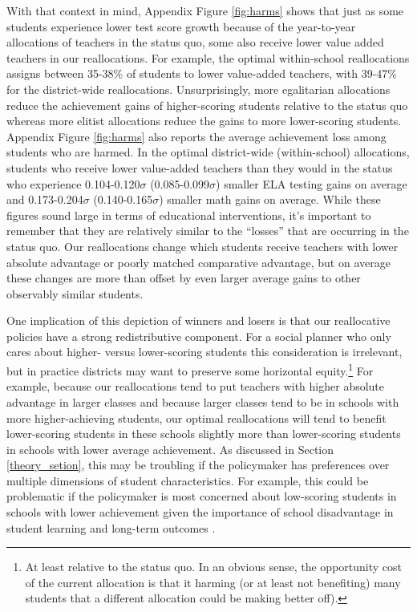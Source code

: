 \documentclass[12pt]{article}
\theoremstyle{definition}
\theoremstyle{definition}
\theoremstyle{definition}
\theoremstyle{definition}
\begin{document}
With that context in mind, Appendix Figure \ref{fig:harms} shows that just as some students experience lower test score growth because of the year-to-year allocations of teachers in the status quo, some also receive lower value added teachers in our reallocations. For example, the optimal within-school reallocations assigns between 35-38\% of students to lower value-added teachers, with 39-47\% for the district-wide reallocations. Unsurprisingly, more egalitarian allocations reduce the achievement gains of higher-scoring students relative to the status quo whereas more elitist allocations reduce the gains to more lower-scoring students. Appendix Figure \ref{fig:harms} also reports the average achievement loss among students who are harmed. In the optimal district-wide (within-school) allocations, students who receive lower value-added teachers than they would in the status who experience 0.104-0.120$\sigma$ (0.085-0.099$\sigma$) smaller ELA testing gains on average and 0.173-0.204$\sigma$ (0.140-0.165$\sigma$) smaller math gains on average. While these figures sound large in terms of educational interventions, it's important to remember that they are relatively similar to the ``losses'' that are occurring in the status quo. Our reallocations change which students receive teachers with lower absolute advantage or poorly matched comparative advantage, but on average these changes are more than offset by even larger average gains to other observably similar students.


One implication of this depiction of winners and losers is that our reallocative policies have a strong redistributive component. For a social planner who only cares about higher- versus lower-scoring students this consideration is irrelevant, but in practice districts may want to preserve some horizontal equity.\footnote{At least relative to the status quo. In an obvious sense, the opportunity cost of the current allocation is that it harming (or at least not benefiting) many students that a different allocation could be making better off).} For example, because our reallocations tend to put teachers with higher absolute advantage in larger classes and because larger classes  tend to be in schools with more higher-achieving students, our optimal  reallocations will tend to benefit lower-scoring students in these schools slightly more than lower-scoring students in schools with lower average achievement. As discussed in Section \ref{theory_setion}, this may be troubling if the policymaker has preferences over multiple dimensions of student characteristics. For example, this could be problematic if the policymaker is most concerned about low-scoring students in schools with lower achievement given the importance of school disadvantage in student learning and long-term outcomes \citep[e.g., see][]{}.
\end{document}

